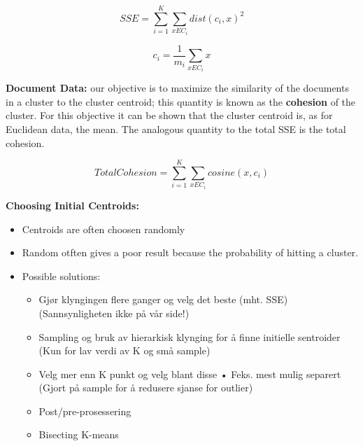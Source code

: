 		\begin{equation}
			SSE = \sum_{i=1}^{K}\sum_{x E C_{i}}^{} dist(c_{i}, x)^{2}
		\end{equation}

		\begin{equation}
			c_{i} = \frac{1}{m_{i}} \sum_{x E C_{i}}^{} x
		\end{equation}

		\clearpage
		{\bf Document Data:} our objective is to maximize the similarity of the documents in a 
		cluster to the cluster centroid; this quantity is known as the {\bf cohesion} of the
		cluster. For this objective it can be shown that the cluster centroid is, as for
		Euclidean data, the mean. The analogous quantity to the total SSE is the total cohesion.

		\begin{equation}
			Total Cohesion = \sum_{i=1}^{K}\sum_{x E C_{i}}^{} cosine(x, c_{i})
		\end{equation}

		{\bf Choosing Initial Centroids:}\\
		\begin{itemize}
			\item Centroids are often choosen randomly
			\item Random otften gives a poor result because the probability of hitting a cluster.
			\item Possible solutions:
				\begin{itemize}
					\item Gjør klyngingen flere ganger og velg det beste (mht. SSE)
					(Sannsynligheten ikke på vår side!) 
					\item Sampling og bruk av hierarkisk klynging for å finne initielle 
					sentroider (Kun for lav verdi av K og små sample)
					\item Velg mer enn K punkt og velg blant disse • Feks. mest mulig separert
					(Gjort på sample for å redusere sjanse for outlier)
					\item Post/pre-prosessering 
					\item Bisecting K-means
				\end{itemize}
		\end{itemize}

